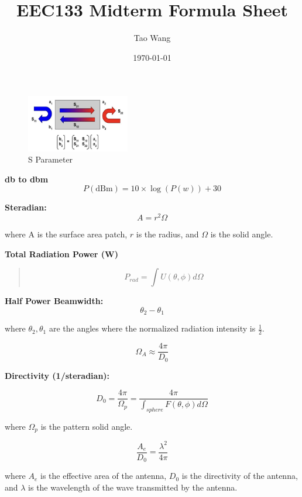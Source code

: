 \documentclass{article} %
\begin{document}
\title{EEC133 Midterm Formula Sheet}
\author{Tao Wang}
\date{\today}

\maketitle

\begin{figure}[H]
    \centering
    \includegraphics[width=0.4\textwidth]{./image/figure1.png}
    \caption{S Parameter}
\end{figure}

\textbf{db to dbm}
\[P(\text{dBm}) = 10 \times \log(P(w)) + 30\]

\textbf{Steradian:}
\[A = r^2 \Omega\]

\begin{center}
    where A is the surface area patch, $r$ is the radius, and $\Omega$ is the solid angle.
\end{center}

\textbf{Total Radiation Power (W)}
\begin{quote}
    \[P_{rad} = \int U(\theta, \phi) d\Omega\]
\end{quote}

\textbf{Half Power Beamwidth:}
\[\theta_2 - \theta_1\]

\begin{center}
    where $\theta_2, \theta_1$ are the angles where the normalized radiation intensity is $\frac{1}{2}$.
\end{center}
\[\Omega_A \approx \frac{4\pi}{D_0}\]

\textbf{Directivity (1/steradian):}

\[D_0 = \frac{4 \pi}{\Omega_p} = \frac{4 \pi}{\int_{sphere} F(\theta, \phi) d\Omega}\]

\begin{center}
    where $\Omega_p$ is the pattern solid angle.
\end{center}

\[\frac{A_e}{D_0} = \frac{\lambda^2}{4 \pi}\]

\begin{center}
    where $A_e$ is the effective area of the antenna, $D_0$ is the directivity of the antenna, and $\lambda$ is the wavelength of the wave transmitted by the antenna.
\end{center}
\end{document}
